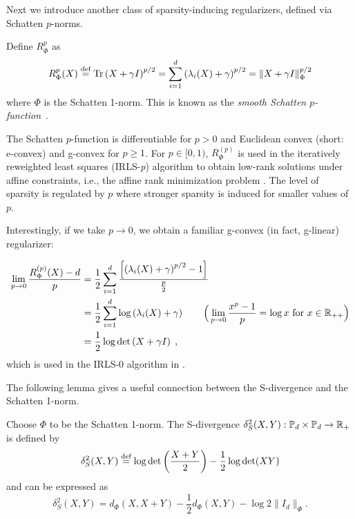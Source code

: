 \documentclass[sn-nature]{sn-jnl}%
\theoremstyle{thmstyleone}%
\theoremstyle{thmstyletwo}%
\theoremstyle{thmstylethree}%
\begin{document}
Next we introduce another class of sparsity-inducing regularizers, defined via Schatten $p$-norms.

\begin{prop}\label{prop:smooth_schatten_norm}
 Define $R_\Phi^{p}$ as 
\[
R^{p}_\Phi(X) \stackrel{\text{def}}{=} \operatorname{Tr}\left(X+\gamma I\right)^{p / 2} = \sum_{i=1}^d \left(\lambda_i(X) + \gamma\right)^{p / 2} = \|X + \gamma I\|_\Phi^{p / 2}
\]
where $\Phi$ is the Schatten 1-norm.
This is known as the \textit{smooth Schatten $p$-function}~\cite{irls_fazel}. 
\end{prop}

The Schatten $p$-function is differentiable for $p > 0$ and Euclidean convex (short: e-convex) and g-convex for $p \geq 1$. For $p \in [0, 1)$, $R_\Phi^{(p)}$ is used in the iteratively reweighted least squares (IRLS-\textit{p}) algorithm to obtain low-rank solutions under affine constraints,  i.e., the affine rank minimization problem \cite{irls_fazel}. The level of sparsity is regulated by $p$ where stronger sparsity is induced for smaller values of $p$. 

\begin{remark}\normalfont
Interestingly, if we take $p \to 0$, we obtain a familiar g-convex (in fact, g-linear) regularizer:

\[
\begin{aligned}
    \lim_{p \to 0}\frac{R^{(p)}_\Phi(X) - d}{p} &= \frac{1}{2}\sum_{i=1}^d \frac{\left[\left(\lambda_i(X) + \gamma \right)^{p / 2} - 1 \right]}{\frac{p}{2}}
    \\&= \frac{1}{2} \sum_{i=1}^d \log \left(\lambda_i(X) + \gamma \right) \qquad \Big( \lim_{p \to 0} \frac{x^p - 1}{p} = \log x \text{ for } x \in \mathbb{R}_{++} \Big)
    \\&= \frac{1}{2}\log \det \left(X + \gamma I\right) \; ,
\end{aligned}
\]
which is used in the IRLS-0 algorithm in \cite{irls_fazel}.
\end{remark}

The following lemma gives a useful connection between the S-divergence and the Schatten 1-norm.
\begin{lemma}[S-Divergence]\label{ex:sdiv}
     Choose $\Phi$ to be the Schatten 1-norm. The S-divergence $\delta_S^2(X,Y): \mathbb{P}_d \times \mathbb{P}_d \to \mathbb{R}_+$ is defined by 
\[
\delta_S^2(X,Y) \stackrel{\text{def}}{=} \log \det \left(\frac{X+Y}{2}\right) - \frac{1}{2}\log \det (XY)
\]
and can be expressed as 
\[
\delta_S^2(X,Y) = d_\Phi(X, X+Y) - \frac{1}{2}d_\Phi(X,Y) - \log 2 \|I_d\|_\Phi.
\]

\end{lemma}
\end{document}
